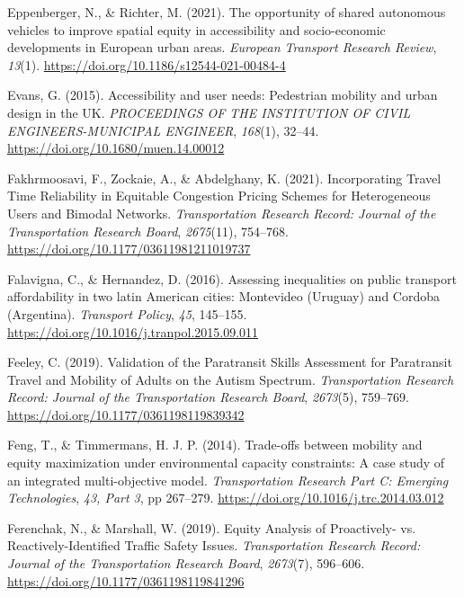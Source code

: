 \documentclass[
  letterpaper,
  DIV=11,
  numbers=noendperiod]{scrartcl}
\newlength{\cslhangindent}
\newenvironment{CSLReferences}[2] %
 {\begin{list}{}{%
  \setlength{\itemindent}{0pt}
  \setlength{\leftmargin}{0pt}
  \setlength{\parsep}{0pt}
  \ifodd #1
   \setlength{\leftmargin}{\cslhangindent}
   \setlength{\itemindent}{-1\cslhangindent}
  \fi
  \setlength{\itemsep}{#2\baselineskip}}}
 {\end{list}}
\begin{document}
\begin{CSLReferences}{1}{0}
Eppenberger, N., \& Richter, M. (2021). The opportunity of shared
autonomous vehicles to improve spatial equity in accessibility and
socio-economic developments in {European} urban areas. \emph{European
Transport Research Review}, \emph{13}(1).
\url{https://doi.org/10.1186/s12544-021-00484-4}

Evans, G. (2015). Accessibility and user needs: Pedestrian mobility and
urban design in the {UK}. \emph{PROCEEDINGS OF THE INSTITUTION OF CIVIL
ENGINEERS-MUNICIPAL ENGINEER}, \emph{168}(1), 32--44.
\url{https://doi.org/10.1680/muen.14.00012}

Fakhrmoosavi, F., Zockaie, A., \& Abdelghany, K. (2021). Incorporating
{Travel Time Reliability} in {Equitable Congestion Pricing Schemes} for
{Heterogeneous Users} and {Bimodal Networks}. \emph{Transportation
Research Record: Journal of the Transportation Research Board},
\emph{2675}(11), 754--768.
\url{https://doi.org/10.1177/03611981211019737}

Falavigna, C., \& Hernandez, D. (2016). Assessing inequalities on public
transport affordability in two latin {American} cities: {Montevideo}
({Uruguay}) and {Cordoba} ({Argentina}). \emph{Transport Policy},
\emph{45}, 145--155. \url{https://doi.org/10.1016/j.tranpol.2015.09.011}

Feeley, C. (2019). Validation of the {Paratransit Skills Assessment} for
{Paratransit Travel} and {Mobility} of {Adults} on the {Autism
Spectrum}. \emph{Transportation Research Record: Journal of the
Transportation Research Board}, \emph{2673}(5), 759--769.
\url{https://doi.org/10.1177/0361198119839342}

Feng, T., \& Timmermans, H. J. P. (2014). Trade-offs between mobility
and equity maximization under environmental capacity constraints: {A}
case study of an integrated multi-objective model. \emph{Transportation
Research Part C: Emerging Technologies}, \emph{43, Part 3}, pp 267--279.
\url{https://doi.org/10.1016/j.trc.2014.03.012}

Ferenchak, N., \& Marshall, W. (2019). Equity {Analysis} of
{Proactively-} vs. {Reactively-Identified Traffic Safety Issues}.
\emph{Transportation Research Record: Journal of the Transportation
Research Board}, \emph{2673}(7), 596--606.
\url{https://doi.org/10.1177/0361198119841296}


\end{CSLReferences}
\end{document}
